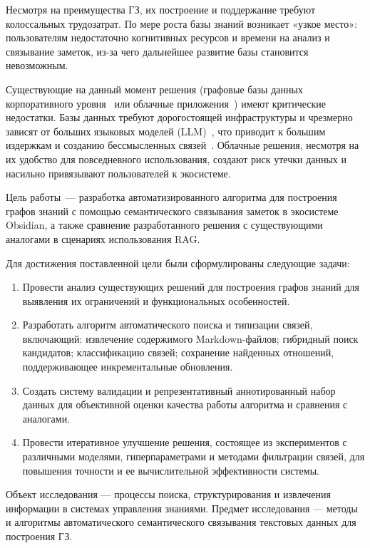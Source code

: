 Несмотря на преимущества ГЗ,
их построение и поддержание требуют колоссальных
трудозатрат. По мере роста базы знаний возникает «узкое место»:
пользователям недостаточно когнитивных ресурсов и времени
на анализ и связывание заметок, из-за чего
дальнейшее развитие базы становится невозможным.

Существующие на данный момент решения
(графовые базы данных корпоративного уровня~\cite{neo4j_graph_builder, memgraph_u2g}
или облачные приложения~\cite{Mem_ai})
имеют критические недостатки.
Базы данных требуют дорогостоящей инфраструктуры
и чрезмерно зависят от больших языковых моделей (LLM)~\cite{Zhao_2023_LLM},
что приводит к большим издержкам и созданию бессмысленных связей~\cite{Ji_2023}.
Облачные решения, несмотря на их удобство для повседневного использования,
создают риск утечки данных и насильно привязывают пользователей к экосистеме.

Цель работы~--- разработка автоматизированного алгоритма
для построения графов знаний с помощью семантического связывания заметок в экосистеме Obsidian,
а также сравнение разработанного решения с существующими аналогами в сценариях использования RAG.

Для достижения поставленной цели были сформулированы следующие задачи:
\begin{enumerate}
    \item Провести анализ существующих решений для построения графов знаний
          для выявления их ограничений и функциональных особенностей.
    \item Разработать алгоритм автоматического поиска и типизации связей, включающий:
          извлечение содержимого Markdown-файлов; гибридный поиск кандидатов; классификацию связей; сохранение
          найденных отношений, поддерживающее инкрементальные обновления.
    \item Создать систему валидации и репрезентативный аннотированный набор данных для объективной оценки качества работы алгоритма
          и сравнения с аналогами.
    \item Провести итеративное улучшение решения, состоящее из экспериментов с различными моделями,
          гиперпараметрами и методами фильтрации связей,
          для повышения точности и ее вычислительной эффективности системы.
\end{enumerate}

Объект исследования — процессы поиска,
структурирования и извлечения информации в системах управления знаниями.
Предмет исследования — методы и алгоритмы автоматического
семантического связывания текстовых данных для построения ГЗ.

